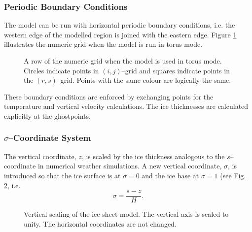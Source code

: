 \subsubsection{Periodic Boundary Conditions}
The model can be run with horizontal periodic boundary conditions, i.e. the western edge of the modelled region is joined with the eastern edge. Figure \ref{num.fig.grid_ew} illustrates the numeric grid when the model is run in torus mode.

\begin{figure}[htbp]
  \centering
  \caption{A row of the numeric grid when the model is used in torus mode. Circles indicate points in $(i,j)$--grid and squares indicate points in the $(r,s)$--grid. Points with the same colour are logically the same.}
  \label{num.fig.grid_ew}
\end{figure}

These boundary conditions are enforced by exchanging points for the temperature and vertical velocity calculations. The ice thicknesses are calculated explicitly at the ghostpoints.

\subsubsection{$\sigma$--Coordinate System}
The vertical coordinate, $z$, is scaled by the ice thickness analogous to the $s$--coordinate in numerical weather simulations. A new vertical coordinate, $\sigma$, is introduced so that the ice surface is at $\sigma=0$ and the ice base at $\sigma=1$ (see Fig. \ref{kin.fig.scale}, i.e.
\begin{equation}
  \label{kin.eq.vertical_scale}
  \sigma=\frac{s-z}{H}.
\end{equation}

\begin{figure}[htbp]
  \begin{center}
    
    \caption[Vertical scaling of the ice sheet model.]{Vertical scaling of the ice sheet model. The vertical axis is scaled to unity. The horizontal coordinates are not changed.}
    \label{kin.fig.scale}
  \end{center}
\end{figure}


